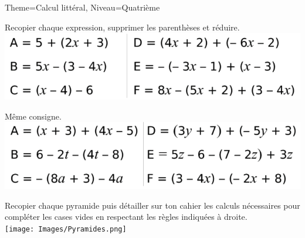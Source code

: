 \documentclass[11pt]{article}
\begin{document}
\begin{multicols}{2}
\begin{Maquette}[Fiche]{Theme=Calcul littéral, Niveau=Quatrième}
        \newpage

        \begin{exercice}
            Recopier chaque expression, supprimer les parenthèses et réduire.\\
            \includegraphics[width=\linewidth]{Images/Parenthèses1.png}
        \end{exercice}

        \begin{exercice}
            Même consigne.\\
            \includegraphics[width=\linewidth]{Images/Parenthèses2.png}
        \end{exercice}
        \columnbreak
        \begin{exercice}
            Recopier chaque pyramide puis détailler sur ton cahier les calculs nécessaires pour compléter les cases vides en respectant les règles indiquées à droite.\\
            \texttt{[image: Images/Pyramides.png]}
        \end{exercice}

    \end{Maquette}

\end{multicols}
\end{document}
